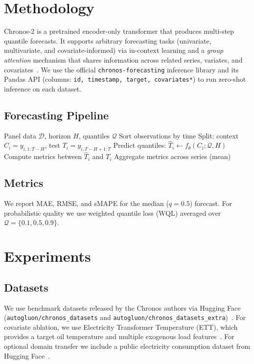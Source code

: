 \documentclass[conference]{IEEEtran}
\begin{document}
\section{Methodology}
Chronos-2 is a pretrained encoder-only transformer that produces multi-step quantile forecasts. It supports arbitrary forecasting tasks (univariate, multivariate, and covariate-informed) via in-context learning and a \emph{group attention} mechanism that shares information across related series, variates, and covariates~\cite{ansari2025chronos2}. We use the official \texttt{chronos-forecasting} inference library and its Pandas API (columns: \texttt{id, timestamp, target, covariates*}) to run zero-shot inference on each dataset.

\subsection{Forecasting Pipeline}
\begin{algorithm}[t]
\caption{Zero-shot evaluation with last-horizon split}
\label{alg:eval}
\begin{algorithmic}[1]
\REQUIRE Panel data $\mathcal{D}$, horizon $H$, quantiles $\mathcal{Q}$
\STATE Sort observations by time
\STATE Split: context $C_i = y_{i,1:T-H}$, test $T_i = y_{i,T-H+1:T}$
\STATE Predict quantiles: $\hat{T}_i \leftarrow f_\theta(C_i; \mathcal{Q}, H)$
\STATE Compute metrics between $\hat{T}_i$ and $T_i$
\ENDFOR
\STATE Aggregate metrics across series (mean)
\end{algorithmic}
\end{algorithm}

\subsection{Metrics}
We report MAE, RMSE, and sMAPE for the median ($q{=}0.5$) forecast. For probabilistic quality we use weighted quantile loss (WQL) averaged over $\mathcal{Q}=\{0.1,0.5,0.9\}$.

\section{Experiments}
\subsection{Datasets}
We use benchmark datasets released by the Chronos authors via Hugging Face (\texttt{autogluon/chronos\_datasets} and \texttt{autogluon/chronos\_datasets\_extra})~\cite{chronosdatasets}. For covariate ablation, we use Electricity Transformer Temperature (ETT), which provides a target oil temperature and multiple exogenous load features~\cite{ettgithub}. For optional domain transfer we include a public electricity consumption dataset from Hugging Face~\cite{electricityhf}.
\end{document}

